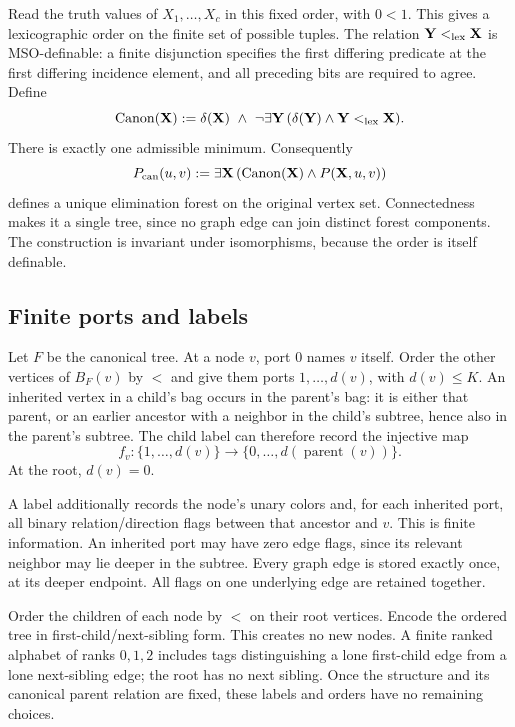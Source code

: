 \documentclass[11pt]{article}
\theoremstyle{definition}\newtheorem{definition}[theorem]{Definition}
\theoremstyle{remark}\newtheorem{remark}[theorem]{Remark}
\begin{document}
Read the truth values of $X_1,\ldots,X_c$ in this fixed order, with $0<1$. This gives a lexicographic order on the finite set of possible tuples. The relation $\mathbf Y<_{\rm lex}\mathbf X$ is MSO-definable: a finite disjunction specifies the first differing predicate at the first differing incidence element, and all preceding bits are required to agree. Define
\[
 \operatorname{Canon}(\mathbf X):=
 \delta(\mathbf X)\ \wedge\ \neg\exists\mathbf Y\,
       (\delta(\mathbf Y)\wedge\mathbf Y<_{\rm lex}\mathbf X).
\]
There is exactly one admissible minimum. Consequently
\[
 P_{\rm can}(u,v):=\exists\mathbf X\,
       (\operatorname{Canon}(\mathbf X)\wedge P(\mathbf X,u,v))
\]
defines a unique elimination forest on the original vertex set. Connectedness makes it a single tree, since no graph edge can join distinct forest components. The construction is invariant under isomorphisms, because the order is itself definable.

\subsection{Finite ports and labels}
Let $F$ be the canonical tree. At a node $v$, port $0$ names $v$ itself. Order the other vertices of $B_F(v)$ by $<$ and give them ports $1,\ldots,d(v)$, with $d(v)\le K$. An inherited vertex in a child's bag occurs in the parent's bag: it is either that parent, or an earlier ancestor with a neighbor in the child's subtree, hence also in the parent's subtree. The child label can therefore record the injective map
\[
 f_v:\{1,\ldots,d(v)\}\longrightarrow
       \{0,\ldots,d(\operatorname{parent}(v))\}.
\]
At the root, $d(v)=0$.

A label additionally records the node's unary colors and, for each inherited port, all binary relation/direction flags between that ancestor and $v$. This is finite information. An inherited port may have zero edge flags, since its relevant neighbor may lie deeper in the subtree. Every graph edge is stored exactly once, at its deeper endpoint. All flags on one underlying edge are retained together.

Order the children of each node by $<$ on their root vertices. Encode the ordered tree in first-child/next-sibling form. This creates no new nodes. A finite ranked alphabet of ranks $0,1,2$ includes tags distinguishing a lone first-child edge from a lone next-sibling edge; the root has no next sibling. Once the structure and its canonical parent relation are fixed, these labels and orders have no remaining choices.
\end{document}
